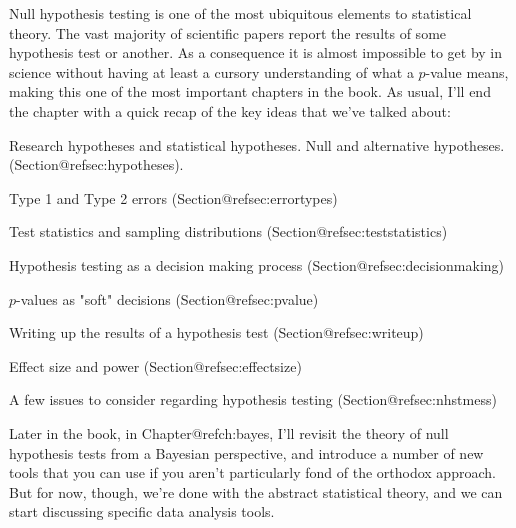 Null hypothesis testing is one of the most ubiquitous elements to statistical theory. The vast majority of scientific papers report the results of some hypothesis test or another. As a consequence it is almost impossible to get by in science without having at least a cursory understanding of what a $p$-value means, making this one of the most important chapters in the book. As usual, I'll end the chapter with a quick recap of the key ideas that we've talked about:

 \itemsep -2pt
\item Research hypotheses and statistical hypotheses. Null and alternative hypotheses. (Section@refsec:hypotheses).
\item Type 1 and Type 2 errors (Section@refsec:errortypes)
\item Test statistics and sampling distributions (Section@refsec:teststatistics)
\item Hypothesis testing as a decision making process (Section@refsec:decisionmaking)
\item $p$-values as "soft" decisions (Section@refsec:pvalue)
\item Writing up the results of a hypothesis test (Section@refsec:writeup)
\item Effect size and power (Section@refsec:effectsize)
\item A few issues to consider regarding hypothesis testing (Section@refsec:nhstmess)



Later in the book, in Chapter@refch:bayes, I'll revisit the theory of null hypothesis tests from a Bayesian perspective, and introduce a number of new tools that you can use if you aren't particularly fond of the orthodox approach. But for now, though, we're done with the abstract statistical theory, and we can start discussing specific data analysis tools.


